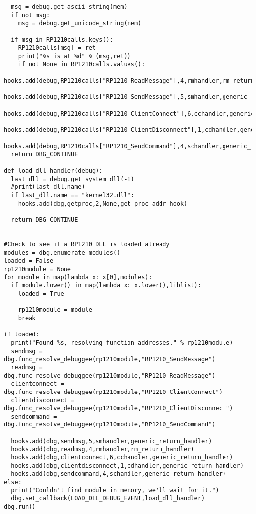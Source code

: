 \begin{appendices}
\begin{verbatim}
  msg = debug.get_ascii_string(mem)
  if not msg:
    msg = debug.get_unicode_string(mem)

  if msg in RP1210calls.keys():
    RP1210calls[msg] = ret
    print("%s is at %d" % (msg,ret))
    if not None in RP1210calls.values():
      hooks.add(debug,RP1210calls["RP1210_ReadMessage"],4,rmhandler,rm_return_handler)
      hooks.add(debug,RP1210calls["RP1210_SendMessage"],5,smhandler,generic_return_handler)
      hooks.add(debug,RP1210calls["RP1210_ClientConnect"],6,cchandler,generic_return_handler)
      hooks.add(debug,RP1210calls["RP1210_ClientDisconnect"],1,cdhandler,generic_return_handler)
      hooks.add(debug,RP1210calls["RP1210_SendCommand"],4,schandler,generic_return_handler)
  return DBG_CONTINUE

def load_dll_handler(debug):
  last_dll = debug.get_system_dll(-1)
  #print(last_dll.name)
  if last_dll.name == "kernel32.dll":
    hooks.add(dbg,getproc,2,None,get_proc_addr_hook)

  return DBG_CONTINUE


#Check to see if a RP1210 DLL is loaded already
modules = dbg.enumerate_modules()
loaded = False
rp1210module = None
for module in map(lambda x: x[0],modules):
  if module.lower() in map(lambda x: x.lower(),liblist):
    loaded = True

    rp1210module = module
    break

if loaded:
  print("Found %s, resolving function addresses." % rp1210module)
  sendmsg = dbg.func_resolve_debuggee(rp1210module,"RP1210_SendMessage")
  readmsg = dbg.func_resolve_debuggee(rp1210module,"RP1210_ReadMessage")
  clientconnect = dbg.func_resolve_debuggee(rp1210module,"RP1210_ClientConnect")
  clientdisconnect = dbg.func_resolve_debuggee(rp1210module,"RP1210_ClientDisconnect")
  sendcommand = dbg.func_resolve_debuggee(rp1210module,"RP1210_SendCommand")

  hooks.add(dbg,sendmsg,5,smhandler,generic_return_handler)
  hooks.add(dbg,readmsg,4,rmhandler,rm_return_handler)
  hooks.add(dbg,clientconnect,6,cchandler,generic_return_handler)
  hooks.add(dbg,clientdisconnect,1,cdhandler,generic_return_handler)
  hooks.add(dbg,sendcommand,4,schandler,generic_return_handler)
else:
  print("Couldn't find module in memory, we'll wait for it.")
  dbg.set_callback(LOAD_DLL_DEBUG_EVENT,load_dll_handler)
dbg.run()





\end{verbatim}


\end{appendices}
